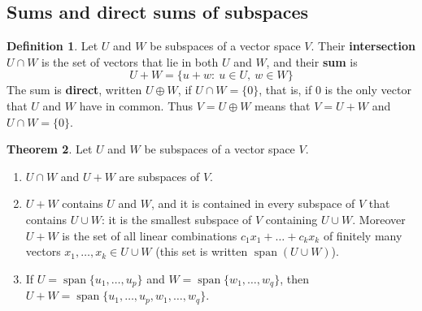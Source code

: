 \documentclass[12pt]{article}
\DeclareMathOperator{\Span}{span}
\theoremstyle{definition}
\newtheorem{theorem}{Theorem}
\newtheorem{definition}[theorem]{Definition}
\begin{document}
\subsection*{Sums and direct sums of subspaces}

\begin{definition}\label{r3-def-sum}
Let \(U\) and \(W\) be subspaces of a vector space \(V\). Their \textbf{intersection}
\(U\cap W\) is the set of vectors that lie in both \(U\) and \(W\), and their \textbf{sum} is
\[
U+W=\{u+w:\ u\in U,\ w\in W\}
\]
The sum is \textbf{direct}, written \(U\oplus W\), if \(U\cap W=\{0\}\), that is, if \(0\) is the
only vector that \(U\) and \(W\) have in common. Thus \(V=U\oplus W\) means that \(V=U+W\) and
\(U\cap W=\{0\}\).
\end{definition}

\begin{theorem}\label{r3-thm-sum}
Let \(U\) and \(W\) be subspaces of a vector space \(V\).
\begin{enumerate}
\item \(U\cap W\) and \(U+W\) are subspaces of \(V\).
\item \(U+W\) contains \(U\) and \(W\), and it is contained in every subspace of \(V\) that
contains \(U\cup W\): it is the smallest subspace of \(V\) containing \(U\cup W\). Moreover
\(U+W\) is the set of all linear combinations \(c_1x_1+\dots+c_kx_k\) of finitely many vectors
\(x_1,\dots,x_k\in U\cup W\) (this set is written \(\Span(U\cup W)\)).
\item If \(U=\Span\{u_1,\dots,u_p\}\) and \(W=\Span\{w_1,\dots,w_q\}\), then
\(U+W=\Span\{u_1,\dots,u_p,w_1,\dots,w_q\}\).
\end{enumerate}
\end{theorem}
\end{document}
